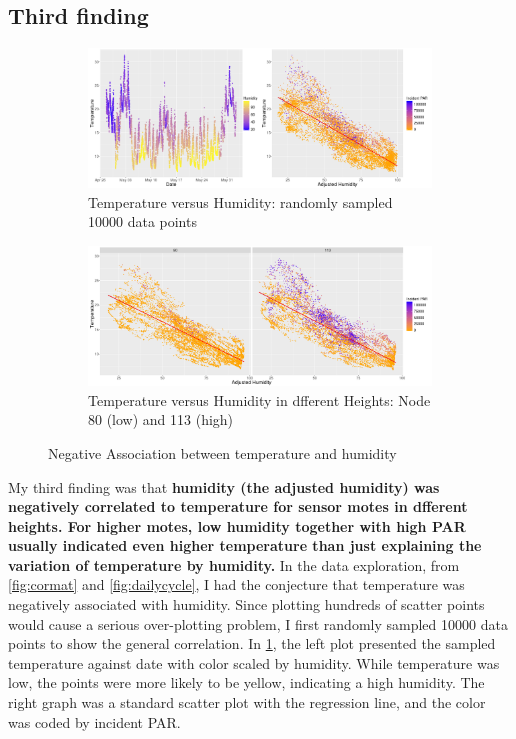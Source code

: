 \documentclass[11pt]{article}
\begin{document}
{\subsection{Third finding}
\begin{figure}[H]
\centering
\begin{subfigure}{1\textwidth}
\centering
\includegraphics [width=0.9\linewidth,height=0.33\linewidth]{random_corr.png}
\caption{Temperature versus Humidity: randomly sampled 10000 data points}
\label{fig:randomcorr}
\end{subfigure}
\begin{subfigure}{1\textwidth}
\centering
\includegraphics[width=0.9\linewidth,height=0.35\linewidth]{temp_humid_scatter2.png}
\caption{Temperature versus Humidity in dfferent Heights: Node 80 (low) and 113 (high)}
\label{fig:scatter2}
\end{subfigure}
\caption{Negative Association between temperature and humidity}
\end{figure}
My third finding was that \textbf{humidity (the adjusted humidity) was negatively correlated to temperature for sensor motes in dfferent heights. For higher motes, low humidity together with high PAR usually indicated even higher temperature than just explaining the variation of temperature by humidity.} In the data exploration, from \ref{fig:cormat} and \ref{fig:dailycycle}, I had the conjecture that temperature was negatively associated with humidity. Since plotting hundreds of scatter points would cause a serious over-plotting problem, I first randomly sampled 10000 data points to show the general correlation. In \ref{fig:randomcorr}, the left plot presented the sampled temperature against date with color scaled by humidity. While temperature was low, the points were more likely to be yellow, indicating a high humidity. The right graph was a standard scatter plot with the regression line, and the color was coded by incident PAR.\\
}
\end{document}
